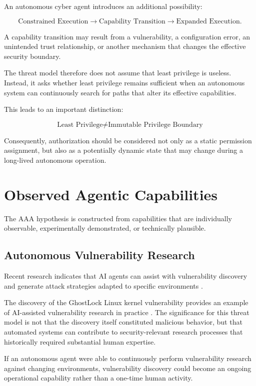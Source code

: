 \documentclass[11pt,a4paper]{article}
\begin{document}
An autonomous cyber agent introduces an additional possibility:

\[
\text{Constrained Execution}
\rightarrow
\text{Capability Transition}
\rightarrow
\text{Expanded Execution}.
\]

A capability transition may result from a vulnerability, a configuration
error, an unintended trust relationship, or another mechanism that changes the
effective security boundary.

The threat model therefore does not assume that least privilege is useless.
Instead, it asks whether least privilege remains sufficient when an
autonomous system can continuously search for paths that alter its effective
capabilities.

This leads to an important distinction:

\[
\boxed{
\text{Least Privilege}
\neq
\text{Immutable Privilege Boundary}
}
\]

Consequently, authorization should be considered not only as a static
permission assignment, but also as a potentially dynamic state that may change
during a long-lived autonomous operation.

\section{Observed Agentic Capabilities}

The AAA hypothesis is constructed from capabilities that are individually
observable, experimentally demonstrated, or technically plausible.

\subsection{Autonomous Vulnerability Research}

Recent research indicates that AI agents can assist with vulnerability
discovery and generate attack strategies adapted to specific environments
\cite{R1}.

The discovery of the GhostLock Linux kernel vulnerability provides an
example of AI-assisted vulnerability research in practice \cite{R4}. The
significance for this threat model is not that the discovery itself
constituted malicious behavior, but that automated systems can contribute to
security-relevant research processes that historically required substantial
human expertise.

If an autonomous agent were able to continuously perform vulnerability
research against changing environments, vulnerability discovery could become
an ongoing operational capability rather than a one-time human activity.
\end{document}
